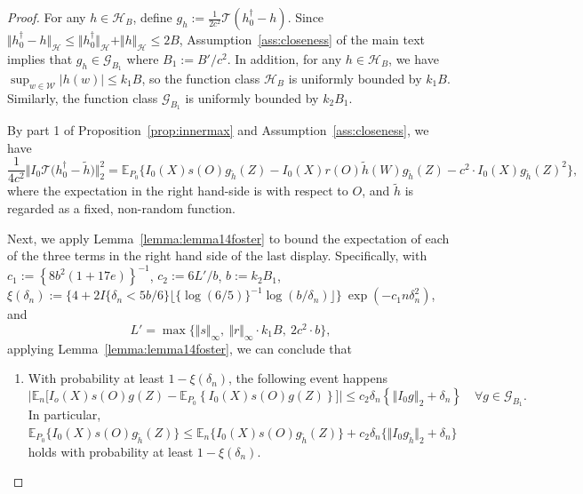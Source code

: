 \documentclass[twoside,11pt]{article}
\newcommand{\E}{\mathbb{E}}
\newcommand{\mc}{\mathcal}
\begin{document}
\begin{proof}
For any $h\in\mc{H}_{B}$, define $g_h:=\frac{1}{2c^2}\mc{T}(h_0^\dag-h)$. Since $\Vert h_0^\dag-h\Vert_{\mc{H}}\le\Vert h_0^\dag\Vert_{\mc{H}}+\Vert h\Vert_{\mc{H}}\le 2B$, Assumption~\ref{ass:closeness} of the main text implies that $g_h\in\mc{G}_{B_1}$ where $B_1:=B'/c^2$. In addition, for any $h\in\mc{H}_{B}$, we have $\sup_{w\in\mc{W}}|h(w)|\le k_1 B $, so the function class $\mc{H}_B$ is uniformly bounded by $k_1 B$. Similarly, the function class $\mc{G}_{B_1}$ is uniformly bounded by $k_2B_1$.
 
 By part 1 of Proposition~\ref{prop:innermax} and Assumption~\ref{ass:closeness}, we have
 \[
  \frac{1}{4c^2}\big\Vert I_0 \mc{T} \big(h_0^\dag-\tilde h\big)\big\Vert^2_2= \E_{P_0}\big\{I_0(X)s(O)g_{\tilde h}(Z)-I_0(X)r(O)\tilde h(W)g_{\tilde h}(Z)-c^2\cdot I_0(X)g_{\tilde h}(Z)^2\big\},
 \]
 where the expectation in the right hand-side is with respect to $O$, and $\tilde h$ is regarded as a fixed, non-random function.

Next, we apply Lemma~\ref{lemma:lemma14foster} to bound the expectation of each of the three terms in the right hand side of the last display. Specifically, with $c_1:=\left\{8b^2(1+17e)\right\}^{-1}$, $c_2:=6L'/b$, $b:=k_2B_1$, $\xi(\delta_n):=\{4+2I\{\delta_n<5b/6\}\lfloor\{\log(6/5)\}^{-1}\log(b/\delta_n)\rfloor\}\:\exp(-c_1n\delta_n^2)$, and
\begin{equation}
    L'=\max\{\Vert s\Vert_\infty,\:\Vert r\Vert_\infty\cdot k_1B,\: 2c^2\cdot b\},\label{def:Lmax}
\end{equation}
applying Lemma~\ref{lemma:lemma14foster}, we can conclude that
\begin{enumerate}
    \item[I.] With probability at least $1-\xi(\delta_n)$, the following event happens
\begin{equation}
    \Big\vert \E_n\big[I_o(X)s(O)g(Z) - \E_{P_0}\left\{I_0(X)s(O)g(Z)\right\} \big]\Big \vert \le c_2\delta_n\left\{\left\Vert I_0g\right\Vert_2+\delta_n\right\} \quad \forall {g \in \mc{G}_{B_1}}. \label{eq:term1sup}
\end{equation}
In particular, $\E_{P_0}\{I_0(X)s(O)g_{\tilde h}(Z)\}\le \E_n\{I_0(X)s(O)g_{\tilde h}(Z)\}+ c_2\delta_n\{\Vert I_0g_{\tilde h}\Vert_2+\delta_n\}$ holds with probability at least $1-\xi(\delta_n)$.


\end{enumerate}
\end{proof}
\end{document}
